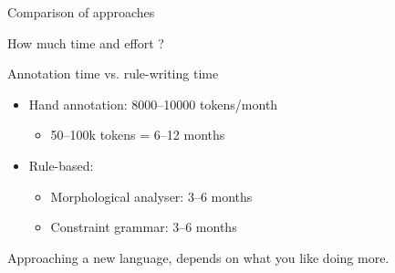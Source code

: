 \documentclass{beamer}
\begin{document}
\begin{frame}{Comparison of approaches}

\end{frame}




\begin{frame}{How much time and effort ?}

\begin{center}
 Annotation time vs. rule-writing time
\end{center}

\begin{itemize}
   \item Hand annotation: 8000--10000 tokens/month 
   \begin{itemize}
     \item 50--100k tokens = 6--12 months
   \end{itemize}
   \item Rule-based:
   \begin{itemize}
    \item  Morphological analyser: 3--6 months
    \item  Constraint grammar: 3--6 months
   \end{itemize}
\end{itemize}

Approaching a new language, depends on what you like doing more.



\end{frame}
\end{document}
